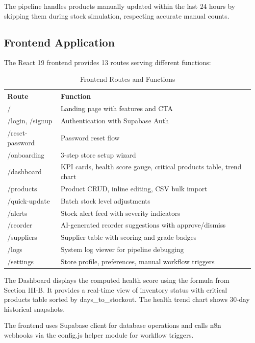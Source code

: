 \documentclass[journal]{IEEEtran}
\begin{document}
The pipeline handles products manually updated within the last 24 hours by skipping them during stock simulation, respecting accurate manual counts.

\subsection{Frontend Application}

The React 19 frontend provides 13 routes serving different functions:

\begin{table}[htbp]
\centering
\caption{Frontend Routes and Functions}
\begin{tabular}{p{3cm}p{6cm}}
\toprule
\textbf{Route} & \textbf{Function} \\
\midrule
/ & Landing page with features and CTA \\
/login, /signup & Authentication with Supabase Auth \\
/reset-password & Password reset flow \\
/onboarding & 3-step store setup wizard \\
/dashboard & KPI cards, health score gauge, critical products table, trend chart \\
/products & Product CRUD, inline editing, CSV bulk import \\
/quick-update & Batch stock level adjustments \\
/alerts & Stock alert feed with severity indicators \\
/reorder & AI-generated reorder suggestions with approve/dismiss \\
/suppliers & Supplier table with scoring and grade badges \\
/logs & System log viewer for pipeline debugging \\
/settings & Store profile, preferences, manual workflow triggers \\
\bottomrule
\end{tabular}
\end{table}

The Dashboard displays the computed health score using the formula from Section III-B. It provides a real-time view of inventory status with critical products table sorted by days\_to\_stockout. The health trend chart shows 30-day historical snapshots.

The frontend uses Supabase client for database operations and calls n8n webhooks via the config.js helper module for workflow triggers.
\end{document}
